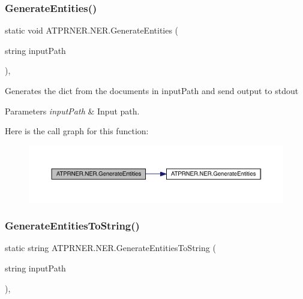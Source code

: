 \subsubsection{\texorpdfstring{Generate\+Entities()}{GenerateEntities()}\hspace{0.1cm}{\footnotesize\ttfamily [2/2]}}
{\footnotesize\ttfamily static void A\+T\+P\+R\+N\+E\+R.\+N\+E\+R.\+Generate\+Entities (\begin{DoxyParamCaption}\item[{string}]{input\+Path }\end{DoxyParamCaption})\hspace{0.3cm}{\ttfamily [inline]}, {\ttfamily [static]}}



Generates the dict from the documents in input\+Path and send output to stdout 


\begin{DoxyParams}{Parameters}
{\em input\+Path} & Input path.\\
\hline
\end{DoxyParams}
Here is the call graph for this function\+:
\nopagebreak
\begin{figure}[H]
\begin{center}
\leavevmode
\includegraphics[width=350pt]{d5/dec/class_a_t_p_r_n_e_r_1_1_n_e_r_afbf080a32a868531adb8c7f4ec5f8035_cgraph}
\end{center}
\end{figure}
\hypertarget{class_a_t_p_r_n_e_r_1_1_n_e_r_a8480137d05620d726021a2f4ae818869}{}\label{class_a_t_p_r_n_e_r_1_1_n_e_r_a8480137d05620d726021a2f4ae818869} 
\subsubsection{\texorpdfstring{Generate\+Entities\+To\+String()}{GenerateEntitiesToString()}}
{\footnotesize\ttfamily static string A\+T\+P\+R\+N\+E\+R.\+N\+E\+R.\+Generate\+Entities\+To\+String (\begin{DoxyParamCaption}\item[{string}]{input\+Path }\end{DoxyParamCaption})\hspace{0.3cm}{\ttfamily [inline]}, {\ttfamily [static]}}



